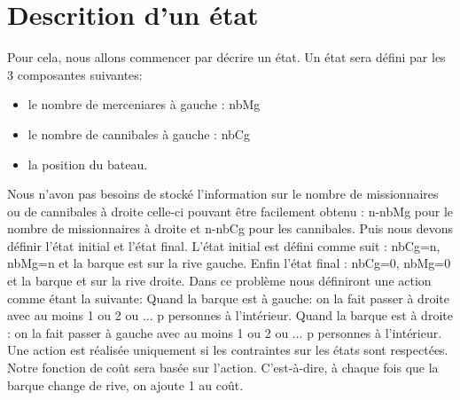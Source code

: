 \documentclass[a4paper, 12pt, french,oneside]{book}
\begin{document}
\section{Descrition d'un état}
Pour cela, nous allons commencer par décrire un état. Un état sera défini par les 3 composantes suivantes:
\begin{itemize}
    \item le nombre de merceniares à gauche : nbMg
    \item le nombre de cannibales à gauche : nbCg
    \item la position du bateau.
\end{itemize}
Nous n'avon pas besoins de stocké l'information sur le nombre de missionnaires ou de cannibales à droite celle-ci pouvant être facilement obtenu : n-nbMg pour le nombre de missionnaires à droite et n-nbCg pour les cannibales. Puis nous devons définir l'état initial et l'état final. L'état initial est défini comme suit : nbCg=n, nbMg=n et la barque est sur la rive gauche. Enfin l'état final : nbCg=0, nbMg=0 et la barque et sur la rive droite. Dans ce problème nous définiront une action comme étant la suivante: Quand la barque est à gauche: on la fait passer à droite avec au moins 1 ou 2 ou ... p personnes à l'intérieur. Quand la barque est à droite : on la fait passer à gauche avec au moins 1 ou 2 ou ... p personnes à l'intérieur. Une action est réalisée uniquement si les contraintes sur les états sont respectées. Notre fonction de coût sera basée sur l'action. C'est-à-dire, à chaque fois que la barque change de rive, on ajoute 1 au coût.
\end{document}
